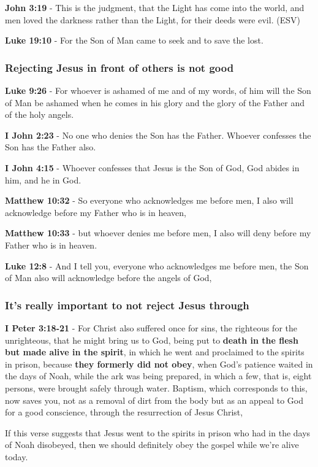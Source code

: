 \documentclass[11pt]{article}
\begin{document}
\textbf{John 3:19} - This is the judgment, that the Light has come into the world, and men loved the darkness rather than the Light, for their deeds were evil. (ESV)

\textbf{Luke 19:10} - For the Son of Man came to seek and to save the lost.

\subsubsection{Rejecting Jesus in front of others is not good}
\label{sec:orge895efd}
\textbf{Luke 9:26} - For whoever is ashamed of me and of my words, of him will the Son of Man be ashamed when he comes in his glory and the glory of the Father and of the holy angels.

\textbf{I John 2:23} - No one who denies the Son has the Father. Whoever confesses the Son has the Father also.

\textbf{I John 4:15} - Whoever confesses that Jesus is the Son of God, God abides in him, and he in God.

\textbf{Matthew 10:32} - So everyone who acknowledges me before men, I also will acknowledge before my Father who is in heaven,

\textbf{Matthew 10:33} - but whoever denies me before men, I also will deny before my Father who is in heaven.

\textbf{Luke 12:8} - And I tell you, everyone who acknowledges me before men, the Son of Man also will acknowledge before the angels of God,

\subsubsection{It's \textbf{really} important to not reject Jesus through}
\label{sec:orgf88059d}

\textbf{I Peter 3:18-21} - For Christ also suffered once for sins, the righteous for the unrighteous, that he might bring us to God, being put to \textbf{death in the flesh but made alive in the spirit}, in which he went and proclaimed to the spirits in prison, because \textbf{they formerly did not obey}, when God's patience waited in the days of Noah, while the ark was being prepared, in which a few, that is, eight persons, were brought safely through water. Baptism, which corresponds to this, now saves you, not as a removal of dirt from the body but as an appeal to God for a good conscience, through the resurrection of Jesus Christ,

If this verse suggests that Jesus went to the spirits in prison who had in the days of Noah disobeyed, then we should definitely obey the gospel while we're alive today.
\end{document}
